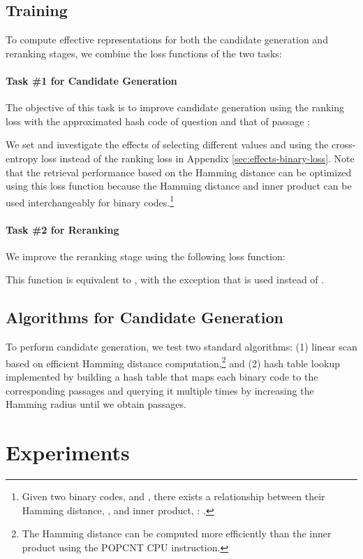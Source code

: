 \documentclass[11pt,a4paper]{article}
\begin{document}
\subsection{Training}
\label{subsec:training}
To compute effective representations for both the candidate generation and reranking stages, we combine the loss functions of the two tasks:


\paragraph{Task \#1 for Candidate Generation}
The objective of this task is to improve candidate generation using the ranking loss with the approximated hash code of question  and that of passage :

We set  and investigate the effects of selecting different  values and using the cross-entropy loss instead of the ranking loss in Appendix \ref{sec:effects-binary-loss}.
Note that the retrieval performance based on the Hamming distance can be optimized using this loss function because the Hamming distance and inner product can be used interchangeably for binary codes.\footnote{Given two binary codes,  and , there exists a relationship between their Hamming distance, , and inner product, : .}

\paragraph{Task \#2 for Reranking}
We improve the reranking stage using the following loss function:

This function is equivalent to , with the exception that  is used instead of .

\subsection{Algorithms for Candidate Generation}
\label{subsec:inference}
To perform candidate generation, we test two standard algorithms: (1) linear scan based on efficient Hamming distance computation,\footnote{The Hamming distance can be computed more efficiently than the inner product using the POPCNT CPU instruction.} and (2) hash table lookup implemented by building a hash table that maps each binary code to the corresponding passages and querying it multiple times by increasing the Hamming radius until we obtain  passages.

\section{Experiments}
\end{document}
